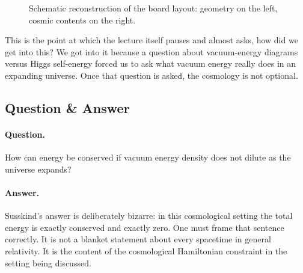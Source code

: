 \begin{figure}[t]
\centering
{}
\caption{Schematic reconstruction of the board layout: geometry on the left, cosmic contents on the right.}
\end{figure}

This is the point at which the lecture itself pauses and almost asks, how did we get into this? We got into it because a question about vacuum-energy diagrams versus Higgs self-energy forced us to ask what vacuum energy really does in an expanding universe. Once that question is asked, the cosmology is not optional.

\subsection{Question \& Answer}

\paragraph{Question.} How can energy be conserved if vacuum energy density does not dilute as the universe expands?

\paragraph{Answer.} Susskind's answer is deliberately bizarre: in this cosmological setting the total energy is exactly conserved and exactly zero. One must frame that sentence correctly. It is not a blanket statement about every spacetime in general relativity. It is the content of the cosmological Hamiltonian constraint in the setting being discussed.

